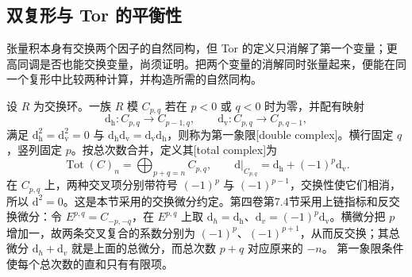 \subsection{双复形与 Tor 的平衡性}
\label{b3:subsec:1505:03}

张量积本身有交换两个因子的自然同构，但 Tor 的定义只消解了第一个变量；更高同调是否也能交换变量，尚须证明。把两个变量的消解同时张量起来，便能在同一个复形中比较两种计算，并构造所需的自然同构。

\ProseParagraphBreak
设 \(R\) 为交换环。一族 \(R\) 模 \(C_{p,q}\) 若在 \(p<0\) 或 \(q<0\) 时为零，并配有映射
\[
	\mathrm{d}_{\mathrm{h}}:C_{p,q}\longrightarrow C_{p-1,q}, \qquad \mathrm{d}_{\mathrm{v}}:C_{p,q}\longrightarrow C_{p,q-1},
\]
满足 \(\mathrm{d}_{\mathrm{h}}^2=\mathrm{d}_{\mathrm{v}}^2=0\) 与 \(\mathrm{d}_{\mathrm{h}}\mathrm{d}_{\mathrm{v}}=\mathrm{d}_{\mathrm{v}}\mathrm{d}_{\mathrm{h}}\)，则称为第一象限[double complex]。横行固定 \(q\)，竖列固定 \(p\)。按总次数合并，定义其[total complex]为
\[
	\operatorname{Tot}(C)_n=\bigoplus_{p+q=n}C_{p,q}, \qquad \mathrm{d}|_{C_{p,q}}=\mathrm{d}_{\mathrm{h}}+(-1)^p\mathrm{d}_{\mathrm{v}}.
\]
在 \(C_{p,q}\) 上，两种交叉项分别带符号 \((-1)^p\) 与 \((-1)^{p-1}\)，交换性使它们相消，所以 \(\mathrm{d}^2=0\)。这是本节采用的交换微分约定。第四卷第7.4节采用上链指标和反交换微分：令 \(E^{p,q}=C_{-p,-q}\)，在 \(E^{p,q}\) 上取 \(\mathrm d_h=\mathrm d_{\mathrm h}\)、\(\mathrm d_v=(-1)^p\mathrm d_{\mathrm v}\)。横微分把 \(p\) 增加一，故两条交叉复合的系数分别为 \((-1)^p\)、\((-1)^{p+1}\)，从而反交换；其总微分 \(\mathrm d_h+\mathrm d_v\) 就是上面的总微分，而总次数 \(p+q\) 对应原来的 \(-n\)。
第一象限条件使每个总次数的直和只有有限项。

